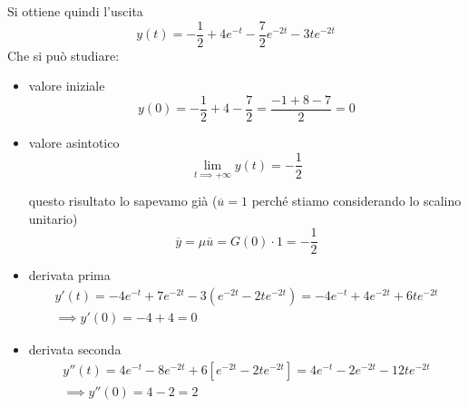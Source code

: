 Si ottiene quindi l'uscita
\begin{equation*}
	y(t)=-\frac{1}{2} +4e^{-t} -\frac{7}{2} e^{-2t} -3te^{-2t}
\end{equation*}
Che si può studiare:
\begin{itemize}
	\item valore iniziale\begin{equation*}
	      y(0) =-\frac{1}{2} +4-\frac{7}{2} =\frac{-1+8-7}{2} =0
	\end{equation*}
	\item valore asintotico\begin{equation*}
	      \lim _{t\implies +\infty } y(t) =-\frac{1}{2}
	\end{equation*}
	
	questo risultato lo sapevamo già ($\overline{u} =1$ perché stiamo considerando lo scalino unitario)\begin{equation*}
	\overline{y} =\mu \overline{u} =G(0) \cdotp 1=-\frac{1}{2}
	\end{equation*}
	\item derivata prima\begin{gather*}
	      y'(t) =-4e^{-t} +7e^{-2t} -3\left(e^{-2t} -2te^{-2t}\right) =-4e^{-t} +4e^{-2t} +6te^{-2t}\\
	      \implies y'(0) =-4+4=0
	\end{gather*}
	\item derivata seconda\begin{gather*}
	      y''(t) =4e^{-t} -8e^{-2t} +6\left[ e^{-2t} -2te^{-2t}\right] =4e^{-t} -2e^{-2t} -12te^{-2t}\\
	      \implies y''(0) =4-2=2
	\end{gather*}
\end{itemize}

